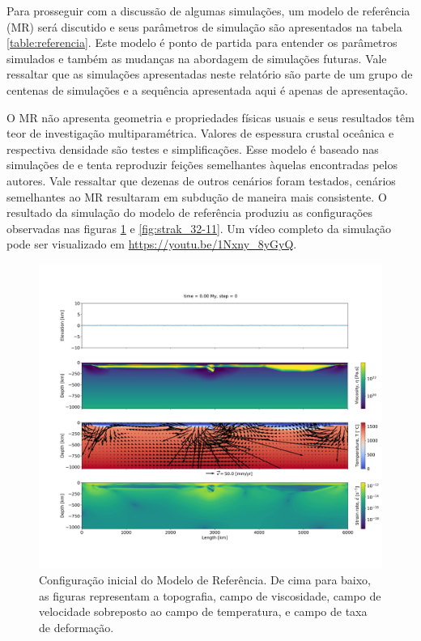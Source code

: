 Para prosseguir com a discussão de algumas simulações, um modelo de referência (MR) será discutido e seus parâmetros de simulação são apresentados na tabela \ref{table:referencia}. Este modelo é ponto de partida para entender os parâmetros simulados e também as mudanças na abordagem de simulações futuras. Vale ressaltar que as simulações apresentadas neste relatório são parte de um grupo de centenas de simulações e a sequência apresentada aqui é apenas de apresentação.

 

O MR não apresenta geometria e propriedades físicas usuais e seus resultados têm teor de investigação multiparamétrica. Valores de espessura crustal oceânica e respectiva densidade são testes e simplificações. Esse modelo é baseado nas simulações de \citet{strak2021thermo} e tenta reproduzir feições semelhantes àquelas encontradas pelos autores. Vale ressaltar que dezenas de outros cenários foram testados, cenários semelhantes ao MR resultaram em subdução de maneira mais consistente. O resultado da simulação do modelo de referência produziu as configurações observadas nas figuras \ref{fig:strak_32-00} e \ref{fig:strak_32-11}. Um vídeo completo da simulação pode ser visualizado em \url{https://youtu.be/1Nxny_8yGyQ}.

\begin{figure}
    \centering
    \includegraphics[trim={5cm 14cm 2cm 12cm}, clip, width=1.0 \textwidth]{fig/strak_32-00.png}
    \caption{Configuração inicial do Modelo de Referência. De cima para baixo, as figuras representam a topografia, campo de viscosidade, campo de velocidade sobreposto ao campo de temperatura, e campo de taxa de deformação.}
    \label{fig:strak_32-00}
\end{figure}

